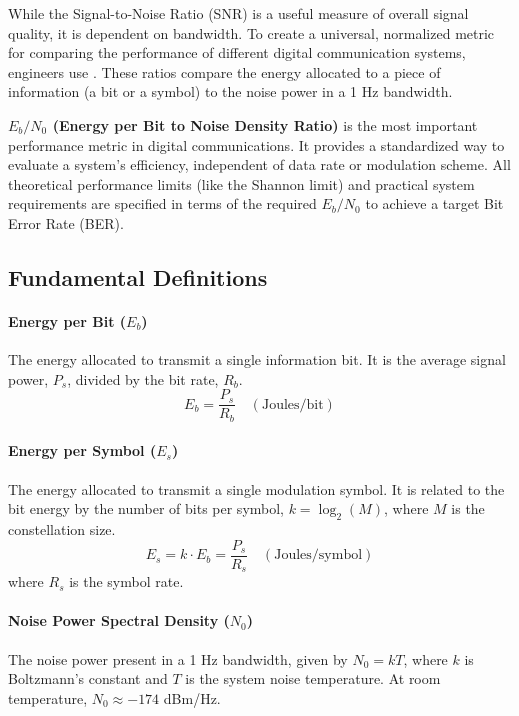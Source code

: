 While the Signal-to-Noise Ratio (SNR) is a useful measure of overall signal quality, it is dependent on bandwidth. To create a universal, normalized metric for comparing the performance of different digital communication systems, engineers use . These ratios compare the energy allocated to a piece of information (a bit or a symbol) to the noise power in a 1 Hz bandwidth.

\begin{keyconcept}
    \textbf{$E_b/N_0$ (Energy per Bit to Noise Density Ratio)} is the most important performance metric in digital communications. It provides a standardized way to evaluate a system's efficiency, independent of data rate or modulation scheme. All theoretical performance limits (like the Shannon limit) and practical system requirements are specified in terms of the required $E_b/N_0$ to achieve a target Bit Error Rate (BER).
\end{keyconcept}


\subsection{Fundamental Definitions}

\paragraph{Energy per Bit ($E_b$)}
The energy allocated to transmit a single information bit. It is the average signal power, $P_s$, divided by the bit rate, $R_b$.
\begin{equation}
    E_b = \frac{P_s}{R_b} \quad (\text{Joules/bit})
\end{equation}

\paragraph{Energy per Symbol ($E_s$)}
The energy allocated to transmit a single modulation symbol. It is related to the bit energy by the number of bits per symbol, $k = \log_2(M)$, where $M$ is the constellation size.
\begin{equation}
    E_s = k \cdot E_b = \frac{P_s}{R_s} \quad (\text{Joules/symbol})
\end{equation}
where $R_s$ is the symbol rate.

\paragraph{Noise Power Spectral Density ($N_0$)}
The noise power present in a 1 Hz bandwidth, given by $N_0 = kT$, where $k$ is Boltzmann's constant and $T$ is the system noise temperature. At room temperature, $N_0 \approx -174$ dBm/Hz.

